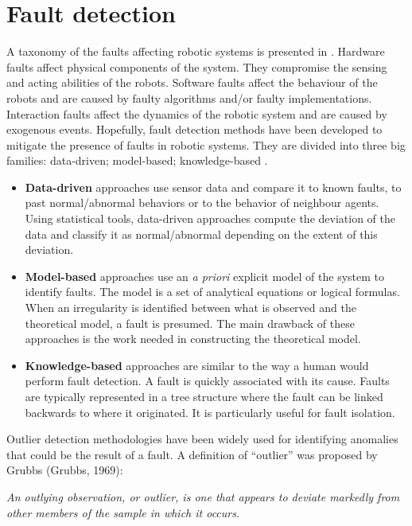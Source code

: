 \section{Fault detection}

A taxonomy of the faults affecting robotic systems is presented in \cite{khalastchi2018fault}. Hardware faults affect physical components of the system. They compromise the sensing and acting abilities of the robots. Software faults affect the behaviour of the robots and are caused by faulty algorithms and/or faulty implementations. Interaction faults affect the dynamics of the robotic system and are caused by exogenous events. Hopefully, fault detection methods have been developed to mitigate the presence of faults in robotic systems. They are divided into three big families: data-driven; model-based; knowledge-based \cite{khalastchi2018fault}. 

\begin{itemize}
\item \textbf{Data-driven} approaches use sensor data and compare it to known faults, to past normal/abnormal behaviors or to the behavior of neighbour agents. Using statistical tools, data-driven approaches compute the deviation of the data and classify it as normal/abnormal depending on the extent of this deviation.
\item \textbf{Model-based} approaches use an \textit{a priori} explicit model of the system to identify faults. The model is a set of analytical equations or logical formulas. When an irregularity is identified between what is observed and the theoretical model, a fault is presumed. The main drawback of these approaches is the work needed in constructing the theoretical model. 
\item \textbf{Knowledge-based} approaches are similar to the way a human would perform fault detection. A fault is quickly associated with its cause. Faults are typically represented in a tree structure where the fault can be linked backwards to where it originated. It is particularly useful for fault isolation.
\end{itemize}

Outlier detection methodologies have been widely used for identifying anomalies that could be the result of a fault. A definition of “outlier” was proposed by Grubbs (Grubbs, 1969): 

\begin{center}
\textit{An outlying observation, or outlier, is one that appears to deviate
markedly from other members of the sample in which it occurs.}
\end{center} 

